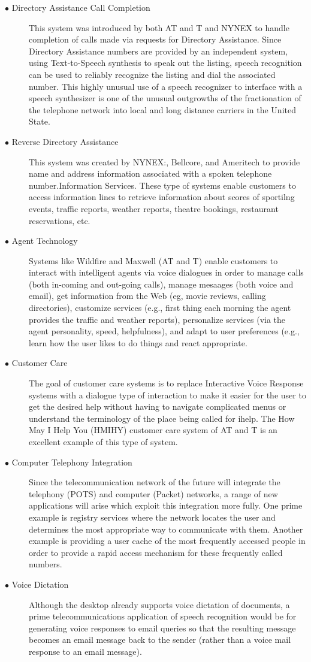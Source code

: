 \documentclass[12pt,a4paper,oldfontcommands]{memoir}
\begin{document}
\begin{description}
  \item[$\bullet$ Directory Assistance Call Completion] This system was introduced by both AT and T and NYNEX to handle completion of calls made via requests for Directory Assistance. Since Directory Assistance numbers are provided by an independent system, using Text-to-Speech synthesis to speak out the listing, speech recognition can be used to reliably recognize the listing and dial the associated number. This highly unusual use of a speech recognizer to interface with a speech synthesizer is one of the unusual outgrowths of the fractionation of the telephone network into local and long distance carriers in the United State.
  \item[$\bullet$ Reverse Directory Assistance] This system was created by NYNEX:, Bellcore, and Ameritech to provide name and address information associated with a spoken telephone number.Information Services. These type of systems enable customers to access information lines to retrieve information about scores of sportilng events, traffic reports, weather reports, theatre bookings, restaurant reservations, etc. 
  \item[$\bullet$ Agent Technology] Systems like Wildfire and Maxwell (AT and T) enable customers to interact with intelligent agents via voice dialogues in order to manage calls (both in-coming and out-going calls), manage mesaages (both voice and email), get information from the Web (eg, movie reviews, calling directories), customize services (e.g., first thing each morning the agent provides the traffic and weather reports), personalize services (via the agent personality, speed, helpfulness), and adapt to user preferences (e.g., learn how the user likes to do things and react appropriate.
  \item[$\bullet$ Customer Care] The goal of customer care systems is to replace Interactive Voice Response systems with a dialogue type of interaction to make it easier for the user to get the desired help without having to navigate complicated menus or understand the terminology of the place being called for ihelp. The How May I Help You (HMIHY) customer care system of AT and T is an excellent example of this type of system.
  \item[$\bullet$ Computer Telephony Integration] Since the telecommunication network of the future will integrate the telephony (POTS) and computer (Packet) networks, a range of new applications will arise which exploit this integration more fully. One prime example is registry services where the network locates the user and determines the most appropriate way to communicate with them. Another example is providing a user cache of the most frequently accessed people in order to provide a rapid access mechanism for these frequently called numbers.
  \item[$\bullet$ Voice Dictation]  Although the desktop already supports voice dictation of documents, a prime telecommunications application of speech recognition would be for generating voice responses to email queries so that the resulting message becomes an email message back to the sender (rather than a voice mail response to an email message).
\end{description}
\end{document}
